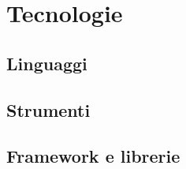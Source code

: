 \section{Tecnologie}

\subsection{Linguaggi}

\subsection{Strumenti}

\subsection{Framework e librerie}